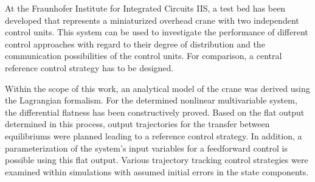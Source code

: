 \documentclass[arbeit=studie,oneside,BCOR=12mm]{ArbeitRST}
\begin{document}
{At the Fraunhofer Institute for Integrated Circuits IIS, a test bed has been developed that represents a miniaturized overhead crane with two independent control units.  This system can be used to investigate the performance of different control approaches with regard to their degree of distribution and the communication possibilities of the control units. For comparison, a central reference control strategy has to be designed.
	
Within the scope of this work, an analytical model of the crane was derived using the Lagrangian formalism. For the determined nonlinear multivariable system, the differential flatness has been constructively proved. Based on the flat output determined in this process, output trajectories for the transfer between equilibriums were planned leading to a reference control strategy. In addition, a parameterization of the system's input variables for a feedforward control is possible using this flat output. Various trajectory tracking control strategies were examined within simulations with assumed initial errors in the state components.}

\tableofcontents



\listoffigures
\end{document}
